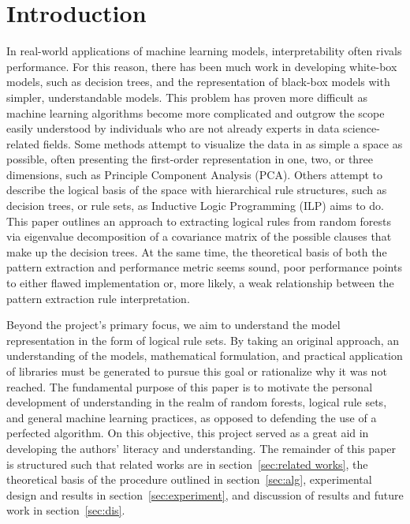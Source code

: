 \documentclass[11pt]{article}
\begin{document}
\section{Introduction}
\label{sec:intro}
In real-world applications of machine learning models, interpretability often rivals performance. For this reason, there has been much work in developing white-box models, such as decision trees, and the representation of black-box models with simpler, understandable models. This problem has proven more difficult as machine learning algorithms become more complicated and outgrow the scope easily understood by individuals who are not already experts in data science-related fields. Some methods attempt to visualize the data in as simple a space as possible, often presenting the first-order representation in one, two, or three dimensions, such as Principle Component Analysis (PCA). Others attempt to describe the logical basis of the space with hierarchical rule structures, such as decision trees, or rule sets, as Inductive Logic Programming (ILP) aims to do. This paper outlines an approach to extracting logical rules from random forests via eigenvalue decomposition of a covariance matrix of the possible clauses that make up the decision trees. At the same time, the theoretical basis of both the pattern extraction and performance metric seems sound, poor performance points to either flawed implementation or, more likely, a weak relationship between the pattern extraction rule interpretation.

Beyond the project's primary focus, we aim to understand the model representation in the form of logical rule sets. By taking an original approach, an understanding of the models, mathematical formulation, and practical application of libraries must be generated to pursue this goal or rationalize why it was not reached. The fundamental purpose of this paper is to motivate the personal development of understanding in the realm of random forests, logical rule sets, and general machine learning practices, as opposed to defending the use of a perfected algorithm. On this objective, this project served as a great aid in developing the authors' literacy and understanding. The remainder of this paper is structured such that related works are in section~\ref{sec:related works}, the theoretical basis of the procedure outlined in section~\ref{sec:alg}, experimental design and results in section~\ref{sec:experiment}, and discussion of results and future work in section~\ref{sec:dis}.


\end{document}
